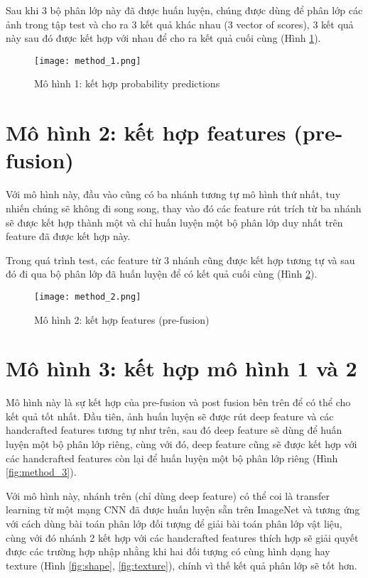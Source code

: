 Sau khi 3 bộ phân lớp này đã được huấn luyện, chúng được dùng để phân lớp các ảnh trong tập test và cho ra 3 kết quả khác nhau (3 vector of scores), 3 kết quả này sau đó được kết hợp với nhau để cho ra kết quả cuối cùng (Hình \ref{fig:method_1}).

\begin{figure}[h!]
	\centering
	\captionsetup{width=0.7\textwidth}
	\texttt{[image: method\_1.png]}
	\caption{Mô hình 1: kết hợp probability predictions}
    \label{fig:method_1}
\end{figure}

\section{Mô hình 2: kết hợp features (pre-fusion)}
Với mô hình này, đầu vào cũng có ba nhánh tương tự mô hình thứ nhất, tuy nhiến chúng sẽ không đi song song, thay vào đó các feature rút trích từ ba nhánh sẽ được kết hợp thành một và chỉ huấn luyện một bộ phân lớp duy nhất trên feature đã được kết hợp này.

Trong quá trình test, các feature từ 3 nhánh cũng được kết hợp tương tự và sau đó đi qua bộ phân lớp đã huấn luyện để có kết quả cuối cùng (Hình \ref{fig:method_2}).

\begin{figure}[h!]
	\centering
	\captionsetup{width=0.7\textwidth}
	\texttt{[image: method\_2.png]}
	\caption{Mô hình 2: kết hợp features (pre-fusion)}
    \label{fig:method_2}
\end{figure}

\section{Mô hình 3: kết hợp mô hình 1 và 2}
Mô hình này là sự kết hợp của pre-fusion và post fusion bên trên để có thể cho kết quả tốt nhất. Đầu tiên, ảnh huấn luyện sẽ được rút deep feature và các handcrafted features tương tự như trên, sau đó deep feature sẽ dùng để huấn luyện một bộ phân lớp riêng, cùng với đó, deep feature cũng sẽ được kết hợp với các handcrafted features còn lại để huấn luyện một bộ phân lớp riêng (Hình \ref{fig:method_3}).

Với mô hình này, nhánh trên (chỉ dùng deep feature) có thể coi là transfer learning từ một mạng CNN đã được huấn luyện sẵn trên ImageNet và tương ứng với cách dùng bài toán phân lớp đối tượng để giải bài toán phân lớp vật liệu, cùng với đó nhánh 2 kết hợp với các handcrafted features thích hợp sẽ giải quyết được các trường hợp nhập nhằng khi hai đối tượng có cùng hình dạng hay texture (Hình \ref{fig:shape}, \ref{fig:texture}), chính vì thế kết quả phân lớp sẽ tốt hơn.

